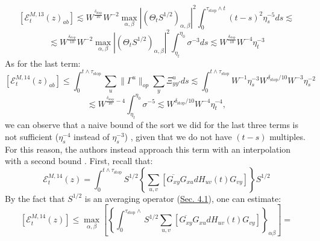 \documentclass[11pt]{article}
\newcommand{\E}{\mathcal{E}}
\newcommand{\sto}{\text{stop}}
\begin{document}
$$\left[\mathcal{E}_{t}^{M, 13}(z)_{ab}\right] \lesssim W^{\frac{\delta_\sto}{10}}W^{-2} \max_{\alpha, \beta}|(\Theta_t S^{1/2})_{\alpha, \beta}|^2 \int_0^{\tau_\sto\wedge t} (t-s)^2 \eta_s^{-5}ds\lesssim $$
$$\lesssim W^{\frac{\delta_\sto}{10}}W^{-2} \max_{\alpha, \beta}|(\Theta_t S^{1/2})_{\alpha, \beta}|^2 \int_{\eta_t}^{\eta_0}\sigma^{-3}ds\lesssim W^{\frac{\delta_\sto}{10}}W^{-4} \eta_t^{-3}$$
As for the last term: $$\left[\mathcal{E}_{t}^{M, 14}(z)_{ab}\right] \leq \int_0^{t\wedge \tau_\sto} \sum_u \|\Gamma^u\|_{op}\sum_y \Xi_{yy'}^uds\lesssim \int_0^{t\wedge \tau_\sto} W^{-1}\eta_s^{-3}W^{\delta_\sto/10}W^{-3}\eta_s^{-2}$$
$$\lesssim W^{\frac{\delta_\sto}{10}-4}\int_{\eta_t}^{\eta_0}\sigma^{-5}\lesssim W^{\delta_\sto/10}W^{-4}\eta_t^{-4},$$
we can observe that a naive bound of the sort we did for the last three terms is not sufficient ($\eta_s^{-4}$ instead of $\eta_s^{-3}$) , given that we do not have $(t-s)$ multiples. For this reason, the authors instead approach this term with an interpolation with a second bound \cite{bandSDE}. First, recall that:
$$\E_t^{M, 14}(z)= \int_0^{t\wedge \tau_\sto}S^{1/2}\left\{\sum_{u, v}\left[\overline{G_{xy}}G_{xu}dH_{uv}(t)G_{vy}\right]\right\}S^{1/2}$$
By the fact that $S^{1/2}$ is an averaging operator (\hyperref[diffusion]{Sec. 4.1}), one can estimate: $$\left[\E_t^{M, 14}(z)\right] \leq \max_{\alpha, \beta}\left[\left\{\int_0^{\tau_\sto\wedge}S^{1/2} \sum_{u, v}\left[\overline{G_{xy}}G_{xu}dH_{uv}(t)G_{vy}\right]\right\}_{\alpha\beta}\right]=$$
\end{document}
